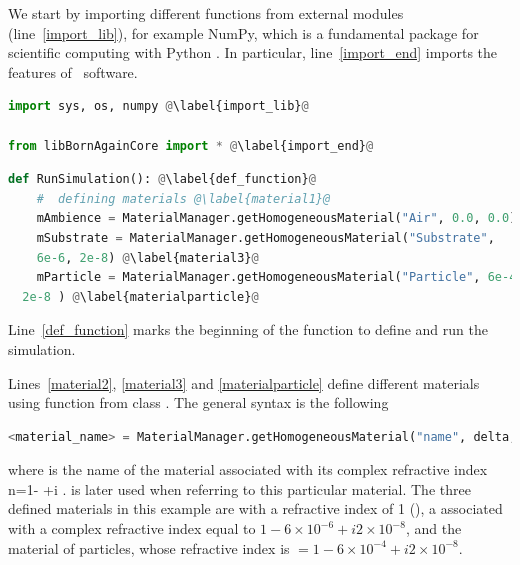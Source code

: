 \noindent We start by importing different functions from external
modules (line~\ref{import_lib}), for example NumPy, which
is a fundamental package for scientific computing with Python \cite{s:numpy}.  In particular, line~\ref{import_end}
imports the features of \BornAgain\ software.\\

\begin{lstlisting}[language=python, style=eclipseboxed,name=ex1,nolol]
import sys, os, numpy @\label{import_lib}@

from libBornAgainCore import * @\label{import_end}@
\end{lstlisting}


 

\begin{lstlisting}[language=python, style=eclipseboxed,name=ex1,nolol]
def RunSimulation(): @\label{def_function}@
    #  defining materials @\label{material1}@
    mAmbience = MaterialManager.getHomogeneousMaterial("Air", 0.0, 0.0)  @\label{material2}@
    mSubstrate = MaterialManager.getHomogeneousMaterial("Substrate",
    6e-6, 2e-8) @\label{material3}@
    mParticle = MaterialManager.getHomogeneousMaterial("Particle", 6e-4,
  2e-8 ) @\label{materialparticle}@
\end{lstlisting}

\noindent Line~\ref{def_function} marks the beginning of the
function to define and run the simulation. 

\noindent Lines~\ref{material2}, \ref{material3} and \ref{materialparticle} define different
materials using function  from class
. The general syntax is the following 

\begin{lstlisting}[language=python, style=eclipse,numbers=none]
<material_name> = MaterialManager.getHomogeneousMaterial("name", delta, beta)
\end{lstlisting}

\noindent where  is the name of the
material associated with its complex refractive index
n=1- +i .  is later used when
referring to this particular material. The three defined materials in this example are  with a refractive
index of 1 (), a  associated with a complex refractive index
equal to $1-6\times 10^{-6} +i2\times 10^{-8} $, and the material of particles, whose refractive index is $=1-6\times 10^{-4}+i2\times 10^{-8}$.\\\\

